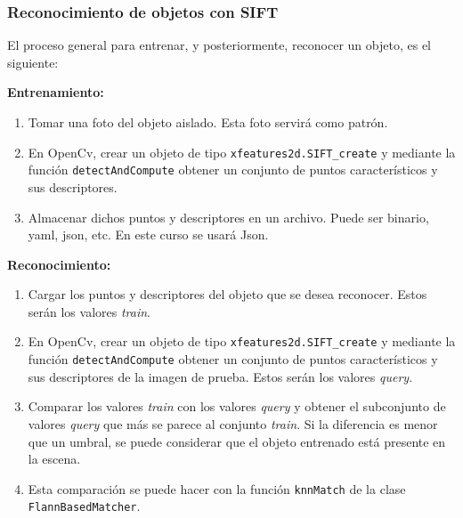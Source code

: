\documentclass[10pt,spanish,aspectratio=1610]{beamer}
\begin{document}
\begin{frame}\frametitle{Reconocimiento de objetos con SIFT}
  El proceso general para entrenar, y posteriormente, reconocer un objeto, es el siguiente:

  \textbf{Entrenamiento:}
  \begin{enumerate}
  \item Tomar una foto del objeto aislado. Esta foto servirá como patrón.
  \item En OpenCv, crear un objeto de tipo \texttt{xfeatures2d.SIFT\_create} y mediante la función \texttt{detectAndCompute} obtener un conjunto de puntos característicos y sus descriptores.
  \item Almacenar dichos puntos y descriptores en un archivo. Puede ser binario, yaml, json, etc. En este curso se usará Json.
  \end{enumerate}

  \textbf{Reconocimiento:}
  \begin{enumerate}
  \item Cargar los puntos y descriptores del objeto que se desea reconocer. Estos serán los valores \textit{train}.
  \item En OpenCv, crear un objeto de tipo \texttt{xfeatures2d.SIFT\_create} y mediante la función \texttt{detectAndCompute} obtener un conjunto de puntos característicos y sus descriptores de la imagen de prueba. Estos serán los valores \textit{query}.
  \item Comparar los valores \textit{train} con los valores \textit{query} y obtener el subconjunto de valores \textit{query} que más se parece al conjunto \textit{train}. Si la diferencia es menor que un umbral, se puede considerar que el objeto entrenado está presente en la escena.
  \item Esta comparación se puede hacer con la función \texttt{knnMatch} de la clase \texttt{FlannBasedMatcher}.
  \end{enumerate}
\end{frame}
\end{document}
